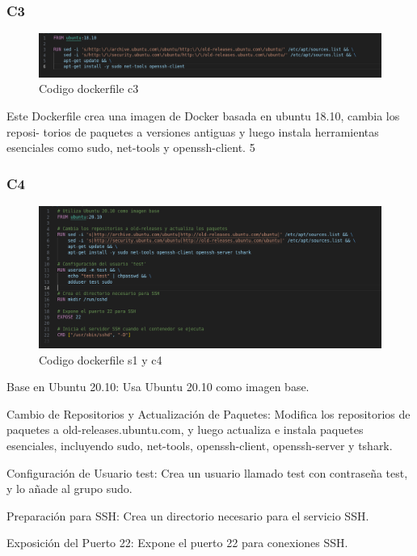 \documentclass[letter,12pt]{article}
\begin{document}
\subsubsection{C3}
    \begin{figure}[H]
        \centering
        \includegraphics[width=1\textwidth]{img/c3.png}
        \caption{Codigo dockerfile c3}
    \end{figure}
Este Dockerfile crea una imagen de Docker basada en ubuntu 18.10, cambia los reposi-
torios de paquetes a versiones antiguas y luego instala herramientas esenciales como sudo,
net-tools y openssh-client.
5

\subsubsection{C4}
    \begin{figure}[H]
        \centering
        \includegraphics[width=1\textwidth]{img/s1_c4.png}
        \caption{Codigo dockerfile s1 y c4}
    \end{figure}
Base en Ubuntu 20.10: Usa Ubuntu 20.10 como imagen base.

Cambio de Repositorios y Actualización de Paquetes: Modifica los repositorios de paquetes a old-releases.ubuntu.com, y luego actualiza e instala paquetes esenciales, incluyendo sudo, net-tools, openssh-client, openssh-server y tshark.

Configuración de Usuario test: Crea un usuario llamado test con contraseña test, y lo añade al grupo sudo.

Preparación para SSH: Crea un directorio necesario para el servicio SSH.

Exposición del Puerto 22: Expone el puerto 22 para conexiones SSH.
\end{document}
